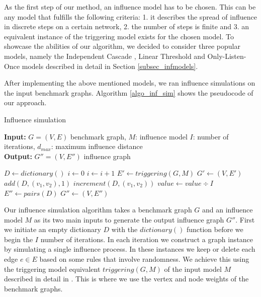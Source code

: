 \documentclass[pdflatex,sn-mathphys-ay]{sn-jnl}
\begin{document}
As the first step of our method, an influence model has to be chosen. This can be any model that fulfills the following criteria: 1. it describes the spread of influence in discrete steps on a certain network, 2. the number of steps is finite and 3. an equivalent instance of the triggering model exists \citep{kempe} for the chosen model. To showcase the abilities of our algorithm, we decided to consider three popular models, namely the Independent Cascade \citep{domingos, kempe}, Linear Threshold \citep{granovetter, kempe} and Only-Listen-Once models \citep{kempe} described in detail in Section \ref{subsec_infmodels}.

After implementing the above mentioned models, we ran influence simulations on the input benchmark graphs. Algorithm \ref{algo_inf_sim} shows the pseudocode of our approach.

\begin{algorithm}[ht]
\caption{Influence simulation}
\label{algo_inf_sim}
\textbf{Input:} $G = (V,E)$ benchmark graph, $M$: influence model $I$: number of iterations, $d_{max}$: maximum influence distance
\\
\textbf{Output:} $G'' = (V,E'')$ influence graph
\begin{algorithmic}[1]
    \State $D \gets dictionary()$
    \State $i \gets 0$
        \State $i \gets i + 1$
        \State $E' \gets triggering(G,M)$
        \State $G' \gets (V,E')$
                    \State $add(D,(v_1,v_2),1)$
                \Else
                    \State $increment(D,(v_1,v_2))$
                \EndIf
            \EndIf
        \EndFor
    \EndWhile
        \State $value \gets value \div I$
    \EndFor
    \State $E'' \gets pairs(D)$
    \State $G'' \gets (V,E'')$
\end{algorithmic}
\end{algorithm}

Our influence simulation algorithm takes a benchmark graph $G$ and an influence model $M$ as its two main inputs to generate the output influence graph $G''$. First we initiate an empty dictionary $D$ with the $dictionary()$ function before we begin the $I$ number of iterations. In each iteration we construct a graph instance by simulating a single influence process. In these instances we keep or delete each edge $e \in E$ based on some rules that involve randomness. We achieve this using the triggering model equivalent $triggering(G,M)$ of the input model $M$ described in detail in \citep{kempe}. This is where we use the vertex and node weights of the benchmark graphs.
\end{document}
